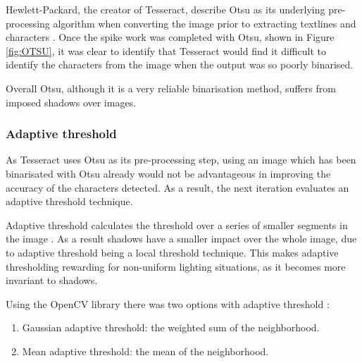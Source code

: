Hewlett-Packard, the creator of Tesseract, describe Otsu as its underlying pre-processing algorithm when converting the image prior to extracting textlines and characters \cite{citeulike:13931186}. Once the spike work was completed with Otsu, shown in Figure \ref{fig:OTSU}, it was clear to identify that Tesseract would find it difficult to identify the characters from the image when the output was so poorly binarised.

Overall Otsu, although it is a very reliable binarisation method, suffers from imposed shadows over images.

\subsubsection{Adaptive threshold} \label{section:threshold}
As Tesseract uses Otsu as its pre-processing step, using an image which has been binarisated with Otsu already would not be advantageous in improving the accuracy of the characters detected. As a result, the next iteration evaluates an adaptive threshold technique.

Adaptive threshold calculates the threshold over a series of smaller segments in the image \cite{citeulike:14021401}. As a result shadows have a smaller impact over the whole image, due to adaptive threshold being a local threshold technique. This makes adaptive thresholding rewarding for non-uniform lighting situations, as it becomes more invariant to shadows.

Using the OpenCV library there was two options with adaptive threshold \cite{citeulike:14021409}:
\begin{enumerate}
  \item Gaussian adaptive threshold: the weighted sum of the neighborhood.
  \item Mean adaptive threshold: the mean of the neighborhood.
\end{enumerate}

